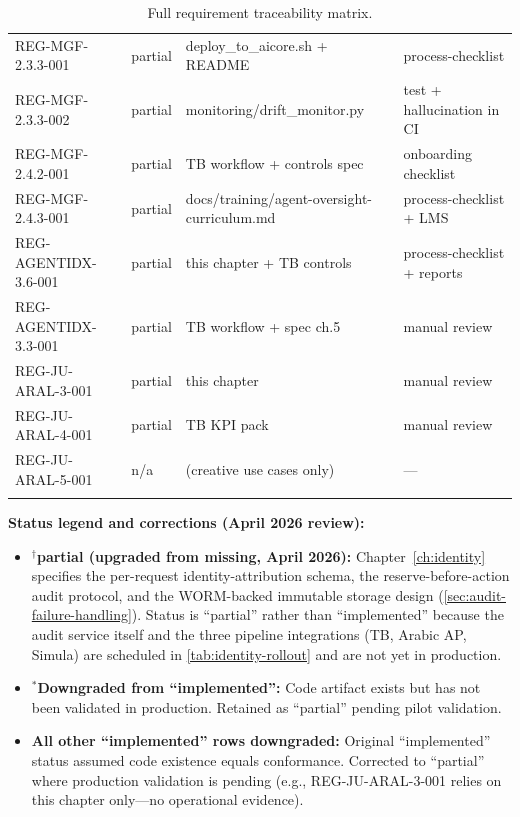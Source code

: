 \documentclass[11pt,a4paper,twoside]{report}
\begin{document}
\begin{longtable}{p{3.5cm}p{1.6cm}p{4.6cm}p{3.6cm}}
REG-MGF-2.3.3-001 & partial       & deploy\_to\_aicore.sh + README              & process-checklist \\
REG-MGF-2.3.3-002 & partial       & monitoring/drift\_monitor.py                & test + hallucination in CI \\
REG-MGF-2.4.2-001 & partial       & TB workflow + controls spec                 & onboarding checklist \\
REG-MGF-2.4.3-001 & partial       & docs/training/agent-oversight-curriculum.md & process-checklist + LMS \\
REG-AGENTIDX-3.6-001 & partial    & this chapter + TB controls                  & process-checklist + reports \\
REG-AGENTIDX-3.3-001 & partial    & TB workflow + spec ch.5                     & manual review \\
REG-JU-ARAL-3-001 & partial       & this chapter                                & manual review \\
REG-JU-ARAL-4-001 & partial       & TB KPI pack                                 & manual review \\
REG-JU-ARAL-5-001 & n/a           & (creative use cases only)                   & --- \\
\bottomrule
\caption{Full requirement traceability matrix.}
\label{tab:trace}
\end{longtable}

\normalsize
\noindent\textbf{Status legend and corrections (April 2026 review):}
\begin{itemize}[nosep]
\item $^\dagger$\textbf{partial (upgraded from missing, April 2026):}
Chapter~\ref{ch:identity} specifies the per-request
identity-attribution schema, the reserve-before-action audit
protocol, and the WORM-backed immutable storage design
(\cref{sec:audit-failure-handling}). Status is ``partial''
rather than ``implemented'' because the audit service itself
and the three pipeline integrations (TB, Arabic AP, Simula)
are scheduled in \cref{tab:identity-rollout} and are not yet
in production.
\item $^*$\textbf{Downgraded from ``implemented'':} Code artifact exists but has not been
validated in production. Retained as ``partial'' pending pilot validation.
\item \textbf{All other ``implemented'' rows downgraded:} Original ``implemented'' status
assumed code existence equals conformance. Corrected to ``partial'' where
production validation is pending (e.g., REG-JU-ARAL-3-001 relies on this
chapter only---no operational evidence).
\end{itemize}
\end{document}
